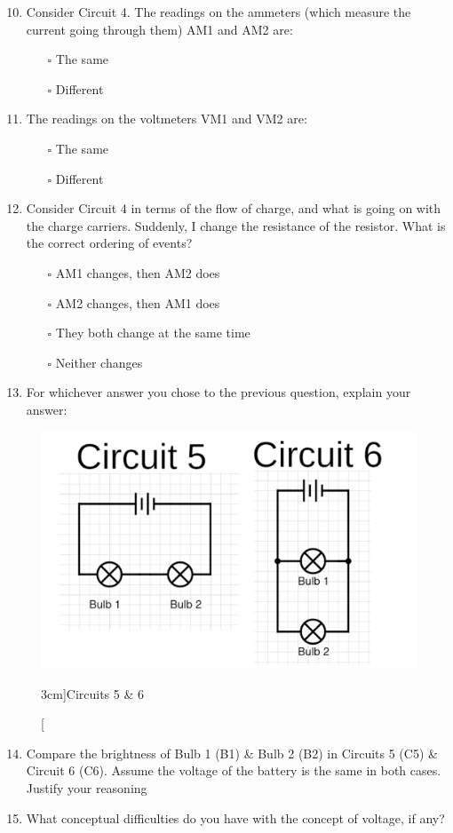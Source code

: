 \documentclass[a4paper,openany,nobib]{tufte-book}
\newcommand{\Qline}[1]{\noindent\rule{#1}{0.6pt}}
\newcounter{ql}
\newcommand{\Qlines}[1]{\forloop{ql}{0}{\value{ql}<#1}{\vskip0em\Qline{\linewidth}}}
\begin{document}
\begin{enumerate}
		\setcounter{enumi}{9}
		\item Consider Circuit 4. The readings on the ammeters (which measure the current going through them) AM1 and AM2 are:
		\begin{itemize}
			\item[$\square$] The same
			\item[$\square$] Different
		\end{itemize}
	\item The readings on the voltmeters VM1 and VM2 are:
		\begin{itemize}
			\item[$\square$] The same
			\item[$\square$] Different
		\end{itemize}
	\item Consider Circuit 4 in terms of the flow of charge, and what is going on with the charge carriers. Suddenly, I change the resistance of the resistor. What is the correct ordering of events?
		\begin{itemize}
			\item[$\square$] AM1 changes, then AM2 does
			\item[$\square$] AM2 changes, then AM1 does
			\item[$\square$] They both change at the same time
			\item[$\square$] Neither changes
		\end{itemize}
\item For whichever answer you chose to the previous question, explain your answer:
		\Qlines{2}
\end{enumerate}
\newpage
{}
\begin{figure}[h!]
	\center
	\includegraphics[width=\linewidth]{comp}
	\caption[][3cm]{Circuits 5 \& 6}
\end{figure}
\begin{enumerate}
		\setcounter{enumi}{13}
		\item Compare the brightness of Bulb 1 (B1) \& Bulb 2 (B2) in Circuits 5 (C5) \& Circuit 6 (C6). Assume the voltage of the battery is the same in both cases. Justify your reasoning 
		\Qlines{2}
		\item What conceptual difficulties do you have with the concept of voltage, if any?
		\Qlines{2}
\end{enumerate}
\nocite{*}
\printbibliography[heading=bibintoc]
\end{document}
